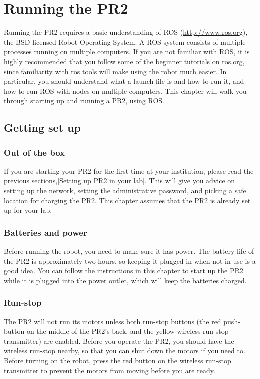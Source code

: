\chapter{Running the PR2}
Running the PR2 requires a basic understanding of ROS (\href{http://www.ros.org}{http://www.ros.org}), the BSD-licensed Robot Operating System.  A ROS system consists of multiple processes running on multiple computers.  If you are not familiar with ROS, it is highly recommended that you follow some of the \href{http://www.ros.org/wiki/ROS/Tutorials}{beginner tutorials} on ros.org, since familiarity with ros tools will make using the robot much easier.  In particular, you should understand what a launch file is and how to run it, and how to run ROS with nodes on multiple computers. This chapter will walk you through starting up and running a PR2, using ROS.


\section{Getting set up}
\subsection{Out of the box}
If you are starting your PR2 for the first time at your institution, please read the previous sections,\ref{Setting up PR2 in your lab}.  This will give you advice on setting up the network, setting the administrative password, and picking a safe location for charging the PR2.  This chapter assumes that the PR2 is already set up for your lab.
\subsection{Batteries and power}
Before running the robot, you need to make sure it has power.  The battery life of the PR2 is approximately two hours, so keeping it plugged in when not in use is a good idea.  You can follow the instructions in this chapter to start up the PR2 while it is plugged into the power outlet, which will keep the batteries charged.
\subsection{Run-stop}
The PR2 will not run its motors unless both run-stop buttons (the red push-button on the middle of the PR2's back, and the yellow wireless run-stop transmitter) are enabled.  Before you operate the PR2, you should have the wireless run-stop nearby, so that you can shut down the motors if you need to.  Before turning on the robot, press the red button on the wireless run-stop transmitter to prevent the motors from moving before you are ready.

